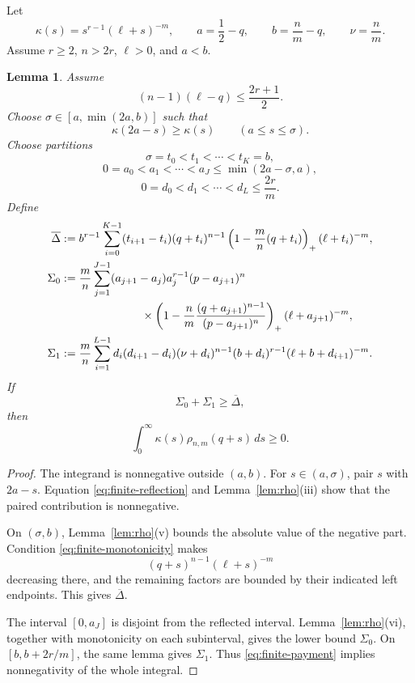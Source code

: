 \documentclass[11pt]{article}
\numberwithin{equation}{section}
\newtheorem{lemma}[theorem]{Lemma}
\begin{document}
Let
\[
        \kappa(s)=s^{r-1}(\ell+s)^{-m},
        \qquad
        a=\frac12-q,
        \qquad
        b=\frac nm-q,
        \qquad
        \nu=\frac nm.
\]
Assume $r\ge2$, $n>2r$, $\ell>0$, and $a<b$.

\begin{lemma}\label{lem:finite-criterion}
Assume
\begin{equation}\label{eq:finite-monotonicity}
        (n-1)(\ell-q)\le\frac{2r+1}{2}.
\end{equation}
Choose $\sigma\in[a,\min(2a,b)]$ such that
\begin{equation}\label{eq:finite-reflection}
        \kappa(2a-s)\ge\kappa(s)
        \qquad(a\le s\le\sigma).
\end{equation}
Choose partitions
\[
 \sigma=t_0<t_1<\cdots<t_K=b,
\]
\[
 0=a_0<a_1<\cdots<a_J\le\min(2a-\sigma,a),
\]
\[
 0=d_0<d_1<\cdots<d_L\le\frac{2r}{m}.
\]
Define
\begin{align*}
 \overline\Delta
 &:=b^{r-1}\sum_{i=0}^{K-1}(t_{i+1}-t_i)
 (q+t_i)^{n-1}
 \left(1-\frac mn(q+t_i)\right)_+
 (\ell+t_i)^{-m},\\
 \Sigma_0
 &:=\frac mn\sum_{j=1}^{J-1}(a_{j+1}-a_j)a_j^{r-1}
 (p-a_{j+1})^n\\
 &\hspace{2.5cm}\times
 \left(1-\frac nm\frac{(q+a_{j+1})^{n-1}}{(p-a_{j+1})^n}\right)_+
 (\ell+a_{j+1})^{-m},\\
 \Sigma_1
 &:=\frac mn\sum_{i=1}^{L-1}d_i(d_{i+1}-d_i)
 (\nu+d_i)^{n-1}(b+d_i)^{r-1}
 (\ell+b+d_{i+1})^{-m}.
\end{align*}
If
\begin{equation}\label{eq:finite-payment}
        \Sigma_0+\Sigma_1\ge\overline\Delta,
\end{equation}
then
\[
        \int_0^\infty\kappa(s)\rho_{n,m}(q+s)\,ds\ge0.
\]
\end{lemma}

\begin{proof}
The integrand is nonnegative outside $(a,b)$. For $s\in(a,\sigma)$, pair $s$ with $2a-s$. Equation \eqref{eq:finite-reflection} and Lemma~\ref{lem:rho}(iii) show that the paired contribution is nonnegative.

On $(\sigma,b)$, Lemma~\ref{lem:rho}(v) bounds the absolute value of the negative part. Condition \eqref{eq:finite-monotonicity} makes
\[
        (q+s)^{n-1}(\ell+s)^{-m}
\]
decreasing there, and the remaining factors are bounded by their indicated left endpoints. This gives $\overline\Delta$.

The interval $[0,a_J]$ is disjoint from the reflected interval. Lemma~\ref{lem:rho}(vi), together with monotonicity on each subinterval, gives the lower bound $\Sigma_0$. On $[b,b+2r/m]$, the same lemma gives $\Sigma_1$. Thus \eqref{eq:finite-payment} implies nonnegativity of the whole integral.
\end{proof}
\end{document}
